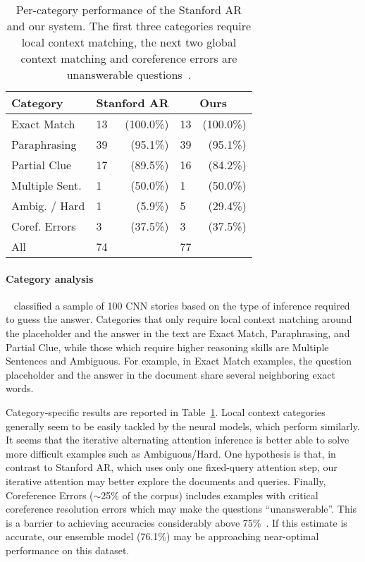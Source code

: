 \documentclass[11pt]{article}
\begin{document}
\begin{table}[t]
    \centering
    \vspace{2mm}
    \begin{tabular}{llrlr}
    \toprule
    Category & \multicolumn{2}{c}{Stanford AR} & \multicolumn{2}{c}{Ours} \\
    \midrule
    
    Exact Match        & 13 & (100.0\%) & 13 & (100.0\%) \\
    Paraphrasing       & 39 & (95.1\%)  & 39 & (95.1\%)  \\
    Partial Clue        & 17 & (89.5\%)  & 16 & (84.2\%)  \\
    \midrule
    Multiple Sent.     & 1  & (50.0\%)  & 1  & (50.0\%)  \\
    Ambig. / Hard   & 1  & (5.9\%)   & 5  & (29.4\%)   \\
    \midrule
    Coref. Errors & 3  & (37.5\%)  & 3  & (37.5\%)  \\
    \midrule
    All                & 74 &   & 77 &      \\
    \bottomrule
    \end{tabular}
    \label{tab:cnn-category}
    \caption{Per-category performance of the Stanford AR and our system. The first three categories require local context matching, the next two global context matching and coreference errors are unanswerable questions~\protect\cite{danqi}.}
\end{table}

\paragraph{Category analysis}~\cite{danqi} classified a sample of 100 CNN stories based on the type of inference required to guess the answer. Categories that only require local context matching around the placeholder and the answer in the text are Exact Match, Paraphrasing, and Partial Clue, while those which require higher reasoning skills are Multiple Sentences and Ambiguous. For example, in Exact Match examples, the question placeholder and the answer in the document share several neighboring exact words.


Category-specific results are reported in Table~\ref{tab:cnn-category}. Local context categories generally seem to be easily tackled by the neural models, which perform similarly. It seems that the iterative alternating attention inference is better able to solve more difficult examples such as Ambiguous/Hard. One hypothesis is that, in contrast to Stanford AR, which uses only one fixed-query attention step, our iterative attention may better explore the documents and queries. Finally, Coreference Errors ($\sim$25\% of the corpus) includes examples with critical coreference resolution errors which may make the questions ``unanswerable''. This is a barrier to achieving accuracies considerably above 75\%~\cite{danqi}. If this estimate is accurate, our ensemble model (76.1\%) may be approaching near-optimal performance on this dataset.
\end{document}
